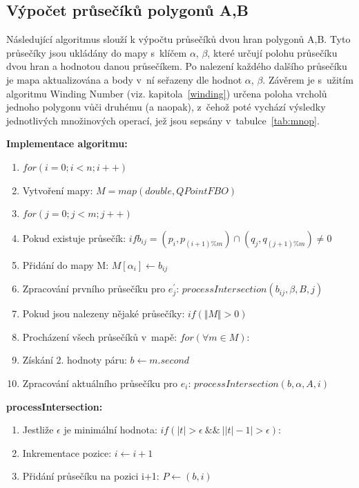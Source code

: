 \documentclass[a4paper, 12pt, oneside, titlepage]{article} %
\begin{document}
\subsection{Výpočet průsečíků polygonů A,B}
Následující algoritmus slouží k výpočtu průsečíků dvou hran polygonů A,B. Tyto průsečíky jsou ukládány do mapy s~klíčem $\alpha$, $\beta$, které určují polohu průsečíku dvou hran a hodnotou danou průsečíkem. Po nalezení každého dalšího průsečíku je mapa aktualizována a body v~ní seřazeny dle hodnot $\alpha$, $\beta$. Závěrem je s~užitím algoritmu Winding Number (viz. kapitola~\ref{winding}) určena poloha vrcholů jednoho polygonu vůči druhému (a naopak), z~čehož poté vychází výsledky jednotlivých množinových operací, jež jsou sepsány v~tabulce~\ref{tab:mnop}.

\noindent\textbf{Implementace algoritmu:}
\begin{enumerate}
\item $for(i=0; i<n; i++)$
\item \quad Vytvoření mapy: $M=map(double,QPointFBO)$
\item \quad $for(j=0; j<m; j++)$
\item \quad \quad Pokud existuje průsečík: $if b_{ij}=(p_i,p_{(i+1)\%m})\cap (q_j,q_{(j+1)\%m}) \neq 0$
\item \quad \quad \quad Přidání do mapy M: $M[\alpha_i] \leftarrow b_{ij}$
\item \quad \quad \quad Zpracování prvního průsečíku pro $e_{j}^{'}$:  $processIntersection(b_{ij}, \beta, B, j)$
\item \quad Pokud jsou nalezeny nějaké průsečíky: $if(\Vert M \Vert >0)$
\item \quad \quad Procházení všech průsečíků v~mapě: $for(\forall m\in M):$ 
\item \quad \quad \quad Získání 2. hodnoty páru: $b\leftarrow m.second$
\item \quad \quad \quad Zpracování aktuálního průsečíku pro $e_i$: $processIntersection(b, \alpha, A, i)$
\end{enumerate}

\noindent\textbf{processIntersection:}
\begin{enumerate}
\item Jestliže $\epsilon$ je minimální hodnota: $if(\vert t \vert > \epsilon~\&\&~\vert \vert t \vert -1 \vert > \epsilon):$
\item \quad Inkrementace pozice: $i \leftarrow i+1$
\item \quad Přidání průsečíku na pozici i+1: $P \leftarrow (b,i)$
\end{enumerate}
\end{document}
